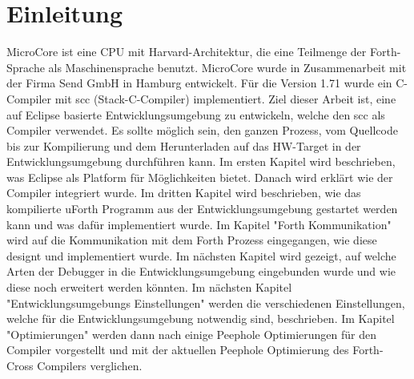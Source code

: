 \chapter{Einleitung}

MicroCore ist eine CPU mit Harvard-Architektur, die eine Teilmenge der Forth-Sprache als Maschinensprache benutzt. MicroCore wurde in Zusammenarbeit mit der Firma Send GmbH in Hamburg entwickelt. Für die Version 1.71 wurde ein C-Compiler mit scc (Stack-C-Compiler) implementiert. Ziel dieser Arbeit ist, eine auf Eclipse basierte Entwicklungsumgebung zu entwickeln, welche den scc als Compiler verwendet. Es sollte möglich sein, den ganzen Prozess, vom Quellcode bis zur Kompilierung und dem Herunterladen auf das HW-Target in der Entwicklungsumgebung durchführen kann. Im ersten Kapitel wird beschrieben, was Eclipse als Platform für Möglichkeiten bietet. Danach wird erklärt wie der Compiler integriert wurde. Im dritten Kapitel wird beschrieben, wie das kompilierte uForth Programm aus der Entwicklungsumgebung gestartet werden kann und was dafür implementiert wurde. Im Kapitel "Forth Kommunikation" wird auf die Kommunikation mit dem Forth Prozess eingegangen, wie diese designt und implementiert wurde. Im nächsten Kapitel wird gezeigt, auf welche Arten der Debugger in die Entwicklungsumgebung eingebunden wurde und wie diese noch erweitert werden könnten. Im nächsten Kapitel "Entwicklungsumgebungs Einstellungen" werden die verschiedenen Einstellungen, welche für die Entwicklungsumgebung notwendig sind, beschrieben. Im Kapitel "Optimierungen" werden dann nach einige Peephole Optimierungen für den Compiler vorgestellt und mit der aktuellen Peephole Optimierung des Forth-Cross Compilers verglichen.
